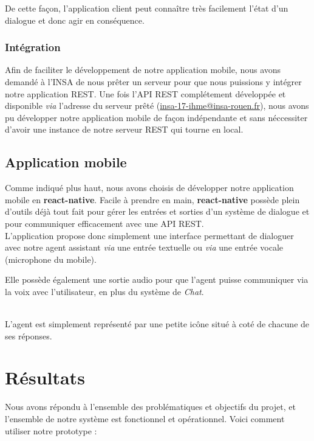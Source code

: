De cette façon, l'application client peut connaître très facilement l'état d'un dialogue et donc agir en conséquence.\\

\subsubsection{Intégration}

Afin de faciliter le développement de notre application mobile, nous avons demandé à l'INSA de nous prêter un serveur pour que nous puissions y intégrer notre 
application REST. Une fois l'API REST complétement développée et disponible \emph{via} l'adresse du serveur prêté (\url{insa-17-ihme@insa-rouen.fr}), nous avons pu développer 
notre application mobile de façon indépendante et sans néccessiter d'avoir une instance de notre serveur REST qui tourne en local.

\subsection{Application mobile}

Comme indiqué plus haut, nous avons choisis de développer notre application mobile en \textbf{react-native}. Facile à prendre en main, \textbf{react-native} possède 
plein d'outils déjà tout fait pour gérer les entrées et sorties d'un système de dialogue et pour communiquer efficacement avec une API REST.\\

L'application propose donc simplement une interface permettant de dialoguer avec notre agent assistant \emph{via} une entrée textuelle ou \emph{via} une entrée vocale (microphone du mobile).

Elle possède également une sortie audio pour que l'agent puisse communiquer via la voix avec l'utilisateur, en plus du système de \emph{Chat}.

~\\\indent
L'agent est simplement représenté par une petite icône situé à coté de chacune de ses réponses.

\section{Résultats}

Nous avons répondu à l'ensemble des problématiques et objectifs du projet, et l'ensemble de notre système est fonctionnel et opérationnel. Voici comment utiliser notre prototype : \\


